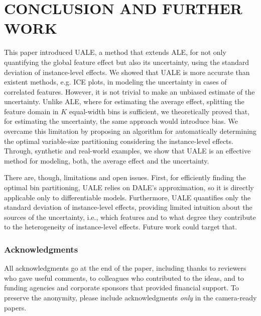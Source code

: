 \documentclass[twoside]{article}
\begin{document}
\section{CONCLUSION AND FURTHER WORK}


This paper introduced UALE, a method that extends ALE, for not only quantifying the global feature effect but also its uncertainty, using the standard deviation of instance-level effects. We showed that UALE is more accurate than existent methods, e.g. ICE plots, in modeling the uncertainty in cases of correlated features. However, it is not trivial to make an unbiased estimate of the uncertainty. Unlike ALE, where for estimating the average effect, splitting the feature domain in \(K\) equal-width bins is sufficient, we theoretically proved that, for estimating the uncertainty, the same approach would introduce bias. We overcame this limitation by proposing an algorithm for automatically determining the optimal variable-size partitioning considering the instance-level effects. Through, synthetic and real-world examples, we show that UALE is an effective method for modeling, both, the average effect and the uncertainty.

There are, though, limitations and open issues. First, for efficiently finding the optimal bin partitioning, UALE relies on DALE's approximation, so it is directly applicable only to differentiable models. Furthermore, UALE quantifies only the standard deviation of instance-level effects, providing limited intuition about the sources of the uncertainty, i.e., which features and to what degree they contribute to the heterogeneity of instance-level effects. Future work could target that.


\clearpage
\subsubsection*{Acknowledgments}
All acknowledgments go at the end of the paper, including thanks to reviewers who gave useful comments, to colleagues who contributed to the ideas, and to funding agencies and corporate sponsors that provided financial support. 
To preserve the anonymity, please include acknowledgments \emph{only} in the camera-ready papers.




\end{document}
